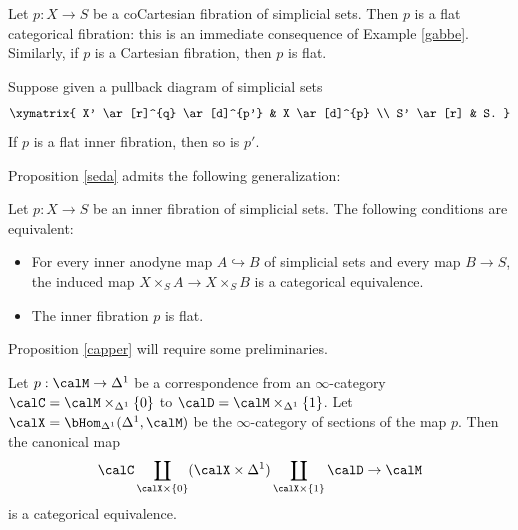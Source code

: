 \begin{example}\label{cartflat}
Let $p: X \rightarrow S$ be a coCartesian fibration of simplicial sets. Then
$p$ is a flat categorical fibration: this is an immediate consequence of Example \ref{gabbe}. Similarly, if
$p$ is a Cartesian fibration, then $p$ is flat.
\end{example}

\begin{remark}
Suppose given a pullback diagram of simplicial sets
$$ \xymatrix{ X' \ar[r]^{q} \ar[d]^{p'} & X \ar[d]^{p} \\
S' \ar[r] & S. }$$
If $p$ is a flat inner fibration, then so is $p'$. 
\end{remark}

Proposition \ref{seda} admits the following generalization:

\begin{proposition}\label{capper}
Let $p: X \rightarrow S$ be an inner fibration of simplicial sets. The following conditions
are equivalent:
\begin{itemize}
\item[$(1)$] For every inner anodyne map $A \hookrightarrow B$ of simplicial sets
and every map $B \rightarrow S$, the induced map $X \times_{S} A \rightarrow X \times_{S} B$
is a categorical equivalence.
\item[$(2)$] The inner fibration $p$ is flat.
\end{itemize}
\end{proposition}

Proposition \ref{capper} will require some preliminaries.

\begin{proposition}\label{balder}
Let $p: \calM \rightarrow \Delta^1$ be a correspondence from an $\infty$-category
$\calC = \calM \times_{ \Delta^1} \{0\}$ to $\calD = \calM \times_{ \Delta^1 } \{1\}$.
Let $\calX = \bHom_{ \Delta^1}( \Delta^1, \calM)$ be the $\infty$-category of sections
of the map $p$. Then the canonical map
$$ \calC \coprod_{ \calX \times \{0\} } (\calX \times \Delta^1) \coprod_{ \calX \times \{1\} } \calD \rightarrow \calM$$
is a categorical equivalence.
\end{proposition}

